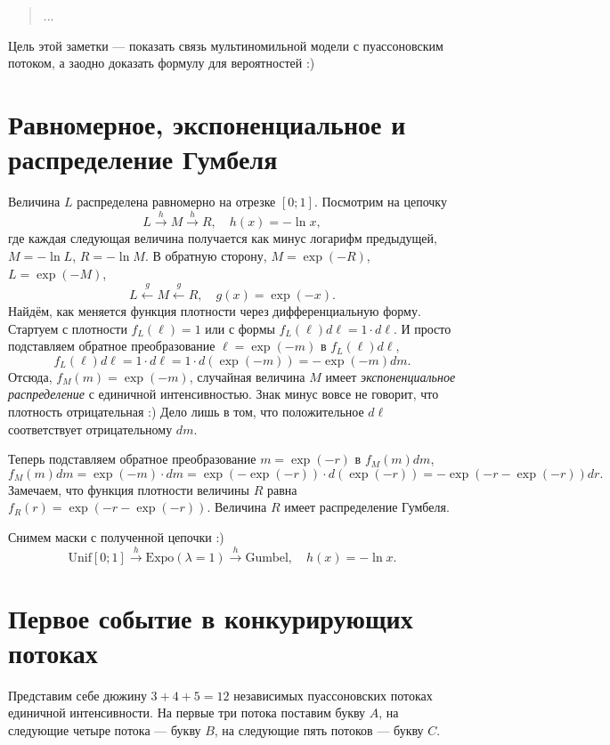 \documentclass[12pt]{article}
\newcommand{\dUnif}{\mathrm{Unif}}
\newcommand{\dExpo}{\mathrm{Expo}} %
\newcommand{\dGumbel}{\mathrm{Gumbel}}
\begin{document}
\begin{verse}
    \begin{flushright}
        ...
    \end{flushright}
\end{verse}

Цель этой заметки — показать связь мультиномильной модели с пуассоновским потоком, а заодно доказать формулу для вероятностей :)


\section*{Равномерное, экспоненциальное и распределение Гумбеля}
Величина $L$ распределена равномерно на отрезке $[0;1]$. 
Посмотрим на цепочку 
\[
L \overset{h}{\rightarrow} M \overset{h}{\rightarrow} R, \quad h(x) = -\ln x,
\] 
где каждая следующая величина получается как минус логарифм предыдущей, $M = -\ln L$, $R = - \ln M$.
В обратную сторону, $M = \exp(-R)$, $L = \exp(- M)$,
\[
    L \overset{g}{\leftarrow} M \overset{g}{\leftarrow} R, \quad g(x) = \exp(-x).
\]
Найдём, как меняется функция плотности через дифференциальную форму.
Стартуем с плотности $f_L(\ell) = 1$ или с формы $f_L(\ell)d\ell = 1\cdot d\ell$.
И просто подставляем обратное преобразование $\ell = \exp(-m)$ в $f_L(\ell)d\ell$,
\[
f_L(\ell)d\ell = 1 \cdot d\ell = 1 \cdot d(\exp(-m)) = -\exp(-m) dm.
\]
Отсюда, $f_M(m)=\exp(-m)$, случайная величина $M$ имеет \emph{экспоненциальное распределение} с единичной интенсивностью. 
Знак минус вовсе не говорит, что плотность отрицательная :) 
Дело лишь в том, что положительное $d\ell$ соответствует отрицательному $dm$. 

Теперь подставляем обратное преобразование $m = \exp(-r)$ в $f_M(m)dm$,
\[
f_M(m)dm = \exp(-m) \cdot dm = \exp(-\exp(-r)) \cdot d(\exp(-r)) = -\exp(-r - \exp(-r)) dr.
\]
Замечаем, что функция плотности величины $R$ равна $f_R(r) = \exp(-r - \exp(-r))$.
Величина $R$ имеет распределение Гумбеля.

Снимем маски с полученной цепочки :)
\[
\dUnif[0; 1] \overset{h}{\rightarrow} \dExpo(\lambda = 1) \overset{h}{\rightarrow} \dGumbel, \quad h(x) = -\ln x.
\]

\section*{Первое событие в конкурирующих потоках}

Представим себе дюжину $3 + 4 + 5 = 12$ независимых пуассоновских потоках единичной интенсивности. 
На первые три потока поставим букву $A$, на следующие четыре потока — букву $B$, на следующие пять потоков — букву $C$.
\end{document}
